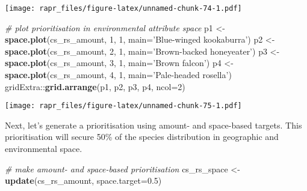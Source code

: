\documentclass[11pt,]{article}
\newenvironment{Shaded}{\begin{snugshade}}{\end{snugshade}}
\newcommand{\KeywordTok}[1]{\textcolor[rgb]{0.13,0.29,0.53}{\textbf{{#1}}}}
\newcommand{\DataTypeTok}[1]{\textcolor[rgb]{0.13,0.29,0.53}{{#1}}}
\newcommand{\DecValTok}[1]{\textcolor[rgb]{0.00,0.00,0.81}{{#1}}}
\newcommand{\FloatTok}[1]{\textcolor[rgb]{0.00,0.00,0.81}{{#1}}}
\newcommand{\StringTok}[1]{\textcolor[rgb]{0.31,0.60,0.02}{{#1}}}
\newcommand{\CommentTok}[1]{\textcolor[rgb]{0.56,0.35,0.01}{\textit{{#1}}}}
\newcommand{\NormalTok}[1]{{#1}}
\let\origfigure\figure
\let\endorigfigure\endfigure
\renewenvironment{figure}[1][2] {
	\expandafter\origfigure\expandafter[H]
} {
	\endorigfigure
}
\begin{document}
\begin{figure}[htbp]
\centering
\texttt{[image: rapr\_files/figure-latex/unnamed-chunk-74-1.pdf]}
\caption{Distribution of amount-based prioritisation in the geographic
attribute space. Points denote combinations of environmental conditions.
Green and grey points represent planning unit selected for and not
selected for prioritisation (respectively). Blue points denote demand
points, and their size indicates their weighting.}
\end{figure}

\begin{Shaded}
\begin{Highlighting}[]
\CommentTok{# plot prioritisation in environmental attribute space}
\NormalTok{p1 <-}\StringTok{ }\KeywordTok{space.plot}\NormalTok{(cs_rs_amount, }\DecValTok{1}\NormalTok{, }\DecValTok{1}\NormalTok{, }\DataTypeTok{main=}\StringTok{'Blue-winged kookaburra'}\NormalTok{)}
\NormalTok{p2 <-}\StringTok{ }\KeywordTok{space.plot}\NormalTok{(cs_rs_amount, }\DecValTok{2}\NormalTok{, }\DecValTok{1}\NormalTok{, }\DataTypeTok{main=}\StringTok{'Brown-backed honeyeater'}\NormalTok{)}
\NormalTok{p3 <-}\StringTok{ }\KeywordTok{space.plot}\NormalTok{(cs_rs_amount, }\DecValTok{3}\NormalTok{, }\DecValTok{1}\NormalTok{, }\DataTypeTok{main=}\StringTok{'Brown falcon'}\NormalTok{)}
\NormalTok{p4 <-}\StringTok{ }\KeywordTok{space.plot}\NormalTok{(cs_rs_amount, }\DecValTok{4}\NormalTok{, }\DecValTok{1}\NormalTok{, }\DataTypeTok{main=}\StringTok{'Pale-headed rosella'}\NormalTok{)}
\NormalTok{gridExtra::}\KeywordTok{grid.arrange}\NormalTok{(p1, p2, p3, p4, }\DataTypeTok{ncol=}\DecValTok{2}\NormalTok{)}
\end{Highlighting}
\end{Shaded}

\begin{figure}[htbp]
\centering
\texttt{[image: rapr\_files/figure-latex/unnamed-chunk-75-1.pdf]}
\caption{Distribution of amount-based prioritisation in the
environmental attribute space. See Figure 28 caption for conventions.}
\end{figure}

Next, let's generate a prioritisation using amount- and space-based
targets. This prioritisation will secure 50\% of the species
distribution in geographic and environmental space.

\begin{Shaded}
\begin{Highlighting}[]
\CommentTok{# make amount- and space-based prioritisation}
\NormalTok{cs_rs_space <-}\StringTok{ }\KeywordTok{update}\NormalTok{(cs_rs_amount, }\DataTypeTok{space.target=}\FloatTok{0.5}\NormalTok{)}
\end{Highlighting}
\end{Shaded}
\end{document}
